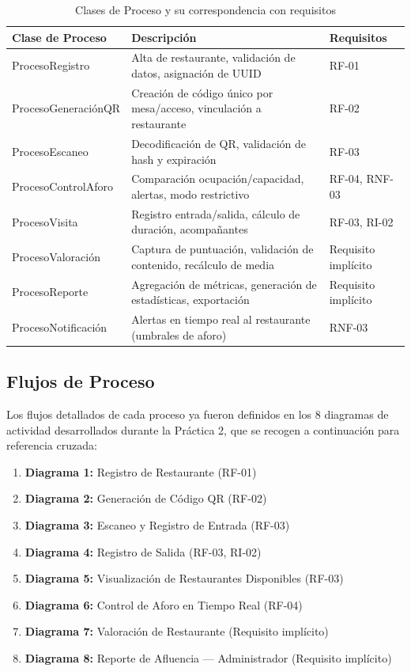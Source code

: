 \begin{table}[H]
    \centering
    \caption{Clases de Proceso y su correspondencia con requisitos}
    \label{tab:clases_proceso}
    \begin{tabular}{|>{\raggedright\arraybackslash}p{}|>{\raggedright\arraybackslash}p{}|>{\raggedright\arraybackslash}p{}|}
        \hline
        \textbf{Clase de Proceso} & \textbf{Descripción} & \textbf{Requisitos} \\
        \hline
        ProcesoRegistro & Alta de restaurante, validación de datos, asignación de UUID & RF-01 \\
        ProcesoGeneraciónQR & Creación de código único por mesa/acceso, vinculación a restaurante & RF-02 \\
        ProcesoEscaneo & Decodificación de QR, validación de hash y expiración & RF-03 \\
        ProcesoControlAforo & Comparación ocupación/capacidad, alertas, modo restrictivo & RF-04, RNF-03 \\
        ProcesoVisita & Registro entrada/salida, cálculo de duración, acompañantes & RF-03, RI-02 \\
        ProcesoValoración & Captura de puntuación, validación de contenido, recálculo de media & Requisito implícito \\
        ProcesoReporte & Agregación de métricas, generación de estadísticas, exportación & Requisito implícito \\
        ProcesoNotificación & Alertas en tiempo real al restaurante (umbrales de aforo) & RNF-03 \\
        \hline
    \end{tabular}
\end{table}

\subsection{Flujos de Proceso}

Los flujos detallados de cada proceso ya fueron definidos en los 8 diagramas de actividad desarrollados durante la Práctica 2, que se recogen a continuación para referencia cruzada:

\begin{enumerate}
    \item \textbf{Diagrama 1:} Registro de Restaurante (RF-01)
    \item \textbf{Diagrama 2:} Generación de Código QR (RF-02)
    \item \textbf{Diagrama 3:} Escaneo y Registro de Entrada (RF-03)
    \item \textbf{Diagrama 4:} Registro de Salida (RF-03, RI-02)
    \item \textbf{Diagrama 5:} Visualización de Restaurantes Disponibles (RF-03)
    \item \textbf{Diagrama 6:} Control de Aforo en Tiempo Real (RF-04)
    \item \textbf{Diagrama 7:} Valoración de Restaurante (Requisito implícito)
    \item \textbf{Diagrama 8:} Reporte de Afluencia — Administrador (Requisito implícito)
\end{enumerate}

